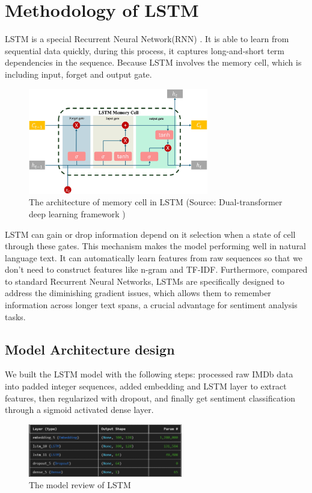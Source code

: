 \section{Methodology of LSTM}
LSTM is a special Recurrent Neural Network(RNN) \cite{sak2014long}. It is able to learn from sequential data quickly, during this process, it captures long-and-short term dependencies in the sequence. Because LSTM involves the memory cell, which is including input, forget and output gate.

\begin{figure}[ht]
    \centering
    \includegraphics[width=0.7\textwidth]{pics/lstm_memory_cell.png}
    \caption{The architecture of memory cell in LSTM (Source: Dual-transformer deep learning framework \cite{chen2025dual})}
\end{figure}

LSTM can gain or drop information depend on it selection when a state of cell through these gates. This mechanism makes the model performing well in natural language text. It can automatically learn features from raw sequences so that we don't need to construct features like n-gram and TF-IDF. Furthermore, compared to standard Recurrent Neural Networks, LSTMs are specifically designed to address the diminishing gradient issues, which allows them to remember information across longer text spans, a crucial advantage for sentiment analysis tasks.

\subsection{Model Architecture design}
We built the LSTM model with the following steps: processed raw IMDb data into padded integer sequences, added embedding and LSTM layer to extract features, then regularized with dropout, and finally get sentiment classification through a sigmoid activated dense layer.

\begin{figure}[ht]
    \centering
    \includegraphics[width=0.6\textwidth]{pics/lstm_model.png}
    \caption{The model review of LSTM}
\end{figure}

